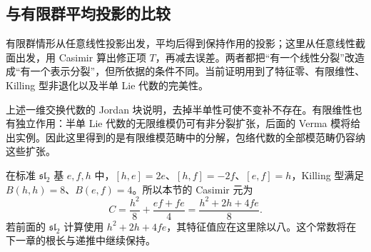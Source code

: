 \subsection{与有限群平均投影的比较}
\label{b5:subsec:1801:03}

有限群情形从任意线性投影出发，平均后得到保持作用的投影；这里从任意线性截面出发，用 Casimir 算出修正项 \(T\)，再减去误差。两者都把“有一个线性分裂”改造成“有一个表示分裂”，但所依据的条件不同。当前证明用到了特征零、有限维性、Killing 型非退化以及半单 Lie 代数的完美性。

\ProseParagraphBreak

上述一维交换代数的 Jordan 块说明，去掉半单性可使不变补不存在。有限维性也有独立作用：半单 Lie 代数的无限维模仍可有非分裂扩张，后面的 Verma 模将给出实例。因此这里得到的是有限维模范畴中的分解，包络代数的全部模范畴仍容纳这些扩张。

\ProseParagraphBreak

在标准 \(\mathfrak{sl}_2\) 基 \(e,f,h\) 中，\([h,e]=2e\)、\([h,f]=-2f\)、\([e,f]=h\)，Killing 型满足 \(B(h,h)=8\)、\(B(e,f)=4\)。所以本节的 Casimir 元为
\begin{equation}\label{b5:eq:sl2-killing-casimir}
	C=\frac{h^2}{8}+\frac{ef+fe}{4} =\frac{h^2+2h+4fe}{8}.
\end{equation}
若前面的 \(\mathfrak{sl}_2\) 计算使用 \(h^2+2h+4fe\)，其特征值应在这里除以八。这个常数将在下一章的根长与递推中继续保持。
